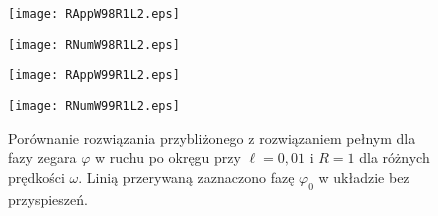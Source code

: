 \begin{figure}[h]
\begin{minipage}[b]{.5\linewidth}
\centering
\texttt{[image: RAppW98R1L2.eps]}
\label{fig:3a1}
\end{minipage}%
\begin{minipage}[b]{.5\linewidth}
\centering
\texttt{[image: RNumW98R1L2.eps]}
\label{fig:3n1}
\end{minipage}
\begin{minipage}[b]{.5\linewidth}
\centering
\texttt{[image: RAppW99R1L2.eps]}
\label{fig:3a2}
\end{minipage}%
\begin{minipage}[b]{.5\linewidth}
\centering
\texttt{[image: RNumW99R1L2.eps]}
\label{fig:3n2}
\end{minipage}
\caption{Porównanie rozwiązania przybliżonego z rozwiązaniem pełnym
dla fazy zegara $\varphi$ w ruchu po okręgu przy
$\ell=0,01$ i $R=1$ dla różnych prędkości $\omega$. 
Linią przerywaną zaznaczono fazę 
$\varphi_0$ w układzie bez przyspieszeń.}\label{fig:3}
\end{figure}
\newpage
